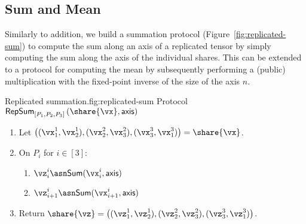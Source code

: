 \subsection{Sum and Mean}

Similarly to addition, we build a summation protocol (Figure~\ref{fig:replicated-sum}) to compute the sum along an axis of a replicated tensor by simply computing the sum along the axis of the individual shares. This can be extended to a protocol for computing the mean by subsequently performing a (public) multiplication with the fixed-point inverse of the size of the axis $n$.


\begin{Boxfig}{Replicated summation.}{fig:replicated-sum}
  {Protocol $\mathsf{RepSum}_{[P_1, P_2, P_3]}\left(\share{\vx}, \mathsf{axis} \right)$}
  
  \begin{enumerate}
  \item Let $\left( (\vx_1^1, \vx_2^1), (\vx_2^2, \vx_3^2), (\vx_3^3, \vx_1^3) \right) = \share{\vx}$.
  
  \item On $P_i$ for $i \in [3]$:
  \begin{enumerate}
    \item $\vz_i^i \asn \mathsf{Sum}(\vx_i^i, \mathsf{axis})$
    \item $\vz_{i+1}^i \asn \mathsf{Sum}(\vx_{i+1}^i, \mathsf{axis})$
  \end{enumerate}
  
  \item Return $\share{\vz} = \left( (\vz_1^1, \vz_2^1), (\vz_2^2, \vz_3^2), (\vz_3^3, \vz_1^3) \right)$.
  \end{enumerate}
\end{Boxfig}
